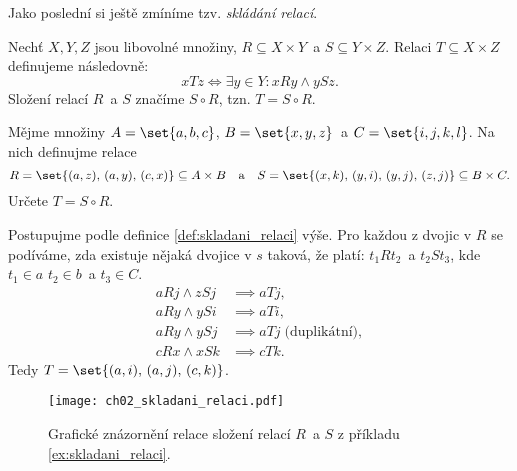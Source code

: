 Jako poslední si ještě zmíníme tzv. \emph{skládání relací}.
\begin{definition}\label{def:skladani_relaci}
    Nechť $X,Y,Z$ jsou libovolné množiny, $R\subseteq X\times Y$~a $S\subseteq Y\times Z$. Relaci $T\subseteq X\times Z$ definujeme následovně:
    \begin{equation*}
        xTz \iff \exists y\in Y : xRy \land ySz.
    \end{equation*}
    Složení relací $R$~a $S$ značíme $S\circ R$, tzn. $T=S\circ R$.
\end{definition}
\begin{example}\label{ex:skladani_relaci}
    Mějme množiny $A=\set{a,b,c}$, $B=\set{x,y,z}$~a $C=\set{i,j,k,l}$. Na nich definujme relace
    \begin{equation*}
        R=\set{(a,z),\,(a,y),\,(c,x)}\subseteq A\times B\quad\text{a}\quad S=\set{(x,k),\,(y,i),\,(y,j),\,(z,j)}\subseteq B\times C.
    \end{equation*}
    Určete $T=S\circ R$.
\end{example}
\begin{solution}
    Postupujme podle definice \ref{def:skladani_relaci} výše. Pro každou z dvojic v $R$ se podíváme, zda existuje nějaká dvojice v $s$ taková, že platí: $t_1Rt_2$~a $t_2St_3$, kde $t_1\in a$ $t_2\in b$~a $t_3\in C$.
    \begin{align*}
        aRj \land zSj &\implies aTj,\\
        aRy \land ySi &\implies aTi,\\
        aRy \land ySj &\implies aTj\;\text{(duplikátní)},\\
        cRx \land xSk &\implies cTk.
    \end{align*}
    Tedy $T=\set{(a,i),\,(a,j),\,(c,k)}$.
\end{solution}
\begin{figure}[H]
    \centering
    \texttt{[image: ch02\_skladani\_relaci.pdf]}
    \caption{Grafické znázornění relace složení relací $R$~a $S$ z příkladu \ref{ex:skladani_relaci}.}
    \label{fig:relace_mezi_mnozinami}
\end{figure}

